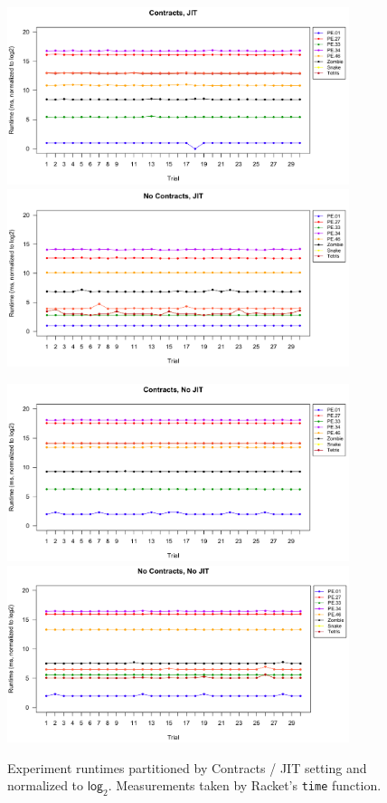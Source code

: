 \begin{figure}[t]
  \begin{center}
  \vspace*{-2cm}\hspace*{-3.5cm}\includegraphics[width=10cm]{data/contracts-jit-runtime.png}\includegraphics[width=10cm]{data/nocontracts-jit-runtime.png}

  \vspace{1cm}\hspace*{-3.5cm}\includegraphics[width=10cm]{data/contracts-nojit-runtime.png}\includegraphics[width=10cm]{data/nocontracts-nojit-runtime.png}
  
  \caption{Experiment runtimes partitioned by Contracts / JIT setting and normalized to $\mathsf{log}_2$. Measurements taken by Racket's \texttt{time} function.}
  \label{fig:trials}
  \end{center}
\end{figure}